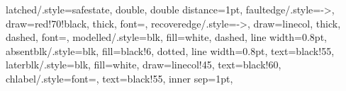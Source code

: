 {  latched/.style={safestate, double, double distance=1pt},
  faultedge/.style={->, draw=red!70!black, thick, font=\sffamily\tiny},
  recoveredge/.style={->, draw=linecol, thick, dashed, font=\sffamily\tiny},
  modelled/.style={blk, fill=white, dashed, line width=0.8pt},
  absentblk/.style={blk, fill=black!6, dotted, line width=0.8pt, text=black!55},
  laterblk/.style={blk, fill=white, draw=linecol!45, text=black!60},
  chlabel/.style={font=\sffamily\tiny, text=black!55, inner sep=1pt},
}


\newcommand{\busdrop}[2]{\draw[busstub] (#1mm,0mm) -- (#2.north);}

\newcommand{\framefield}[4]{%
  \node[#3, minimum width=#2mm, text width={#2mm-2pt}] at (#1mm,0mm) {#4};}
\newcommand{\framebits}[3]{\node[fbyte] at ({#1mm+0.5*#2mm},6mm) {#3};}

\newcommand{\sumnode}[5]{%
  \node[sumj] (#1) at (#2mm,#3mm) {};%
  \node[font=\sffamily\tiny] at ({#2mm-2.6mm},{#3mm+2.6mm}) {#4};%
  \node[font=\sffamily\tiny] at ({#2mm-2.6mm},{#3mm-2.6mm}) {#5};}
